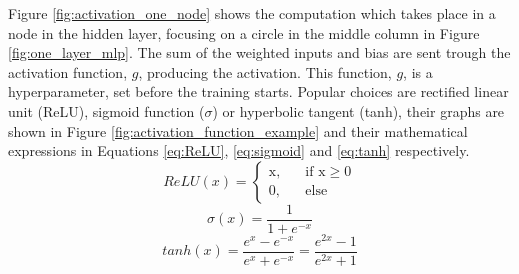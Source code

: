 Figure \ref{fig:activation_one_node} shows the computation which takes place in a node in the hidden layer, focusing on a circle in the middle column in Figure \ref{fig:one_layer_mlp}. The sum of the weighted inputs and bias are sent trough the activation function, $g$, producing the activation. This function, $g$, is a hyperparameter, set before the training starts. Popular choices are rectified linear unit (ReLU), sigmoid function  ($\sigma$) or hyperbolic tangent (tanh), their graphs are shown in Figure \ref{fig:activation_function_example} and their mathematical expressions in Equations \eqref{eq:ReLU}, \eqref{eq:sigmoid} and \eqref{eq:tanh} respectively.
\begin{equation} \label{eq:ReLU}
   ReLU\left(x\right) = 
     \begin{cases}
       \text{x,} &\quad\text{if x} \ge 0\\
       \text{0,} &\quad\text{else}
     \end{cases}
\end{equation}
\begin{equation} \label{eq:sigmoid}
   \sigma \left( x \right) = \frac{1}{1 + e^{-x}}
\end{equation}
\begin{equation} \label{eq:tanh}
   tanh\left( x \right) = \frac{e^x - e^{-x}}{e^x + e^{-x}} = \frac{e^{2x} - 1}{e^{2x} + 1}
\end{equation}

